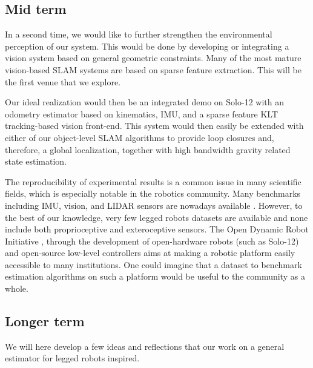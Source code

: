 \subsection{Mid term}

In a second time, we would like to further strengthen the environmental perception of our system. This would be done by developing or integrating a vision system
based on general geometric constraints. Many of the most mature vision-based SLAM systems are based on sparse feature extraction. This will be 
the first venue that we explore. 

Our ideal realization would then be an integrated demo on Solo-12 with an odometry estimator based on kinematics, IMU, and a sparse feature KLT \cite{baker2004lucas} tracking-based 
vision front-end. This system would then easily be extended with either of our object-level SLAM algorithms to provide loop closures and, therefore, a global localization, together
with high bandwidth gravity related state estimation.

The reproducibility of experimental results is a common issue in many scientific fields, which is especially notable in the robotics community. Many benchmarks including 
IMU, vision, and LIDAR sensors are nowadays available \cite{Burri25012016, cortes2018advio, kasper2019benchmark, zhang2021multi}. However, to the best of our knowledge,
very few legged robots datasets are available \cite{fink2020dls, ahmadi2021semi} and none include both proprioceptive and exteroceptive sensors. The Open Dynamic Robot Initiative \cite{grimminger2020open}, 
through the development of open-hardware robots (such as Solo-12) and open-source low-level controllers aims at making a robotic platform easily accessible to
many institutions. One could imagine that a dataset to benchmark estimation algorithms on such a platform would be useful to the community as a whole. 


\subsection{Longer term}

We will here develop a few ideas and reflections that our work on a general estimator for legged robots inspired.

